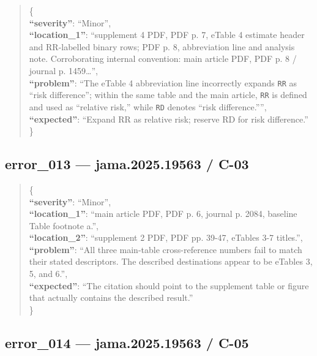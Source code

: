 \documentclass[
  letterpaper,
  9pt]{extreport}
\begin{document}
\begin{quote}
\{\\
\textbf{``severity''}: ``Minor'',\\
\textbf{``location\_1''}: ``supplement 4 PDF, PDF p. 7, eTable 4
estimate header and RR-labelled binary rows; PDF p. 8, abbreviation line
and analysis note. Corroborating internal convention: main article PDF,
PDF p. 8 / journal p. 1459\ldots{}'',\\
\textbf{``problem''}: ``The eTable 4 abbreviation line incorrectly
expands \texttt{RR} as ``risk difference''; within the same table and
the main article, \texttt{RR} is defined and used as ``relative risk,''
while \texttt{RD} denotes ``risk difference.'''',\\
\textbf{``expected''}: ``Expand RR as relative risk; reserve RD for risk
difference.''\\
\}
\end{quote}

\hypertarget{error_013--jama202519563--c-03}{%
\subsection{error\_013 --- jama.2025.19563 /
C-03}\label{error_013--jama202519563--c-03}}

\begin{quote}
\{\\
\textbf{``severity''}: ``Minor'',\\
\textbf{``location\_1''}: ``main article PDF, PDF p. 6, journal p. 2084,
baseline Table footnote a.'',\\
\textbf{``location\_2''}: ``supplement 2 PDF, PDF pp. 39-47, eTables 3-7
titles.'',\\
\textbf{``problem''}: ``All three main-table cross-reference numbers
fail to match their stated descriptors. The described destinations
appear to be eTables 3, 5, and 6.'',\\
\textbf{``expected''}: ``The citation should point to the supplement
table or figure that actually contains the described result.''\\
\}
\end{quote}

\hypertarget{error_014--jama202519563--c-05}{%
\subsection{error\_014 --- jama.2025.19563 /
C-05}\label{error_014--jama202519563--c-05}}
\end{document}
